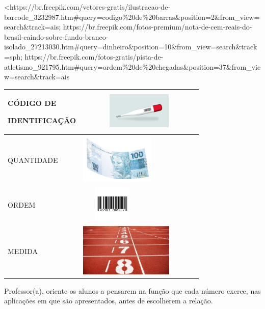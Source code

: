 \textless{}https://br.freepik.com/vetores-gratis/ilustracao-de-barcode\_3232987.htm\#query=codigo\%20de\%20barras\&position=2\&from\_view=search\&track=ais;
https://br.freepik.com/fotos-premium/nota-de-cem-reais-do-brasil-caindo-sobre-fundo-branco-isolado\_27213030.htm\#query=dinheiro\&position=10\&from\_view=search\&track=sph;
https://br.freepik.com/fotos-gratis/pista-de-atletismo\_921795.htm\#query=ordem\%20de\%20chegadas\&position=37\&from\_view=search\&track=ais

\begin{longtable}[]{@{}ll@{}}
\toprule
\begin{minipage}[b]{0.48\columnwidth}\raggedright\strut
CÓDIGO DE

IDENTIFICAÇÃO\strut
\end{minipage} & \begin{minipage}[b]{0.48\columnwidth}\raggedright\strut
\includegraphics[width=2.28891in,height=0.67601in]{media/image3.jpeg}\strut
\end{minipage}\tabularnewline
\midrule
\endhead
QUANTIDADE &
\includegraphics[width=1.39514in,height=0.94497in]{media/image4.jpeg}\tabularnewline
ORDEM &
\includegraphics[width=1.19792in,height=0.69792in]{media/image5.jpeg}\tabularnewline
MEDIDA &
\includegraphics[width=1.75972in,height=0.98664in]{media/image6.jpeg}\tabularnewline
\bottomrule
\end{longtable}

Professor(a), oriente os alunos a pensarem na função que cada número
exerce, nas aplicações em que são apresentados, antes de escolherem a
relação.

